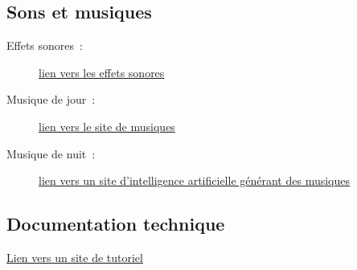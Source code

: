 \documentclass[a4paper,12pt]{article}
\begin{document}
\begin{appendices}
\subsection{Sons et musiques}
\begin{description}
	\item[Effets sonores :] \href{https://pixabay.com/fr/sound-effects/}{lien vers les effets sonores}
	\item[Musique de jour :] \href{https://www.jamendo.com/?language=fr}{lien vers le site de musiques}
	\item[Musique de nuit :] \href{https://www.udio.com/}{lien vers un site d'intelligence artificielle générant des musiques}
\end{description}

\subsection{Documentation technique}
\href{https://openclassrooms.com/forum/sujet/projet-termine-jeu-de-plateforme-cree-en-sdl-2}{Lien vers un site de tutoriel}

%

\end{appendices}

\end{document}
